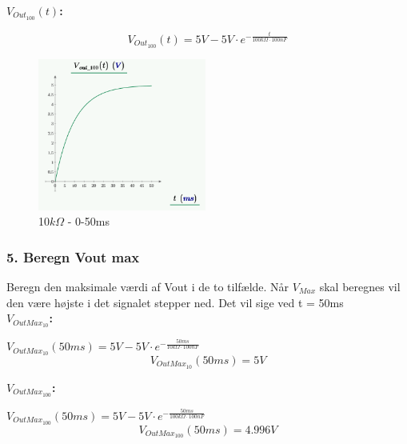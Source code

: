 \textbf{$V_{Out_{100}}(t)$:}
\begin{center}
\begin{equation}
V_{Out_{100}}(t) = 5V-5V \cdot e^{-\frac{t}{100k\Omega \cdot 100nF}} 
\label{V_Out_100}
\end{equation}
\end{center}



\begin{figure}[h]
\begin{center}
\includegraphics[height=5cm]{M_Fig/V_out_100_1}
\caption{10$k\Omega$ - 0-50ms}
\label{100kOhm50ms}
\end{center}
\end{figure}



\subsubsection*{5. Beregn Vout max}
Beregn den maksimale værdi af Vout i de to tilfælde.
Når $V_{Max}$ skal beregnes vil den være højste i det signalet stepper ned. Det vil sige ved t = 50ms \\

\textbf{$V_{OutMax_{10}}$:}

\begin{center}
$V_{OutMax_{10}}(50ms) = 5V-5V \cdot e^{-\frac{50ms}{10k\Omega \cdot 100nF}} $
\begin{equation}
V_{OutMax_{10}}(50ms)=5V
\label{V_OutMax_10}
\end{equation}
\end{center}

\textbf{$V_{OutMax_{100}}$:}

\begin{center}
$V_{OutMax_{100}}(50ms) = 5V-5V \cdot e^{-\frac{50ms}{100k\Omega \cdot 100nF}} $
\begin{equation}
V_{OutMax_{100}}(50ms)=4.996V
\label{V_OutMax_100}
\end{equation}
\end{center}


